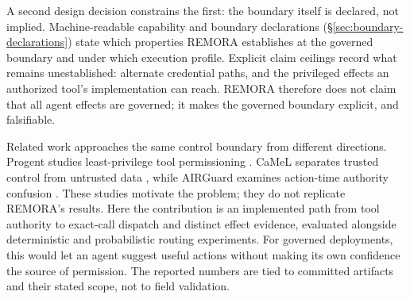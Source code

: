 \documentclass[10pt,twocolumn]{article}
\begin{document}
A second design decision constrains the first: the boundary itself is
declared, not implied. Machine-readable capability and boundary
declarations (\S\ref{sec:boundary-declarations}) state which properties
REMORA establishes at the governed boundary and under which execution
profile. Explicit claim ceilings record what remains unestablished:
alternate credential paths, and the privileged effects an authorized
tool's implementation can reach. REMORA therefore does not claim that
all agent effects are governed; it makes the governed boundary
explicit, and falsifiable.

Related work approaches the same control boundary from different
directions. Progent studies least-privilege tool permissioning
\cite{shi2025progent}. CaMeL separates trusted control from untrusted data
\cite{debenedetti2025camel}, while AIRGuard examines action-time authority
confusion \cite{qin2026airguard}. These studies motivate the problem;
they do not replicate REMORA's results. Here the contribution is an
implemented path from tool authority to exact-call dispatch and distinct
effect evidence, evaluated alongside deterministic and probabilistic
routing experiments. For governed deployments, this would let an agent
suggest useful actions without making its own confidence the source of
permission. The reported numbers are tied to committed
artifacts and their stated scope, not to field validation.
\end{document}
